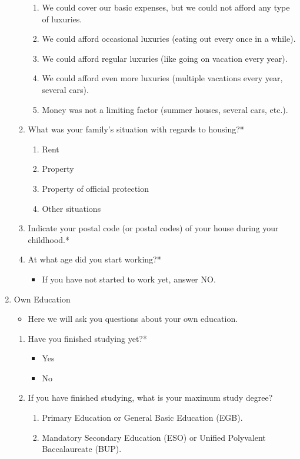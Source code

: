 \documentclass[12pt]{article}
\begin{document}
\begin{enumerate}
\begin{enumerate}
\begin{enumerate}
\item We could cover our basic expenses, but we could not afford any type of luxuries.
\item We could afford occasional luxuries (eating out every once in a while).
\item We could afford regular luxuries (like going on vacation every year).
\item We could afford even more luxuries (multiple vacations every year, several cars).
\item Money was not a limiting factor (summer houses, several cars, etc.). 
\end{enumerate}
\item What was your family's situation with regards to housing?*
\begin{enumerate}
\item Rent
\item Property
\item Property of official protection
\item Other situations
\end{enumerate}
\item Indicate your postal code (or postal codes) of your house during your childhood.*
\item At what age did you start working?*
\begin{itemize}
\item If you have not started to work yet, answer NO.
\end{itemize}
\end{enumerate}
\item Own Education
\begin{itemize}
\item Here we will ask you questions about your own education.
\end{itemize}
\begin{enumerate}
\item Have you finished studying yet?*
\begin{itemize}
\item Yes
\item No
\end{itemize}
\item If you have finished studying, what is your maximum study degree?
\begin{enumerate}
\item Primary Education or General Basic Education (EGB).
\item Mandatory Secondary Education (ESO) or Unified Polyvalent Baccalaureate (BUP).

\end{enumerate}
\end{enumerate}
\end{enumerate}
\end{document}
